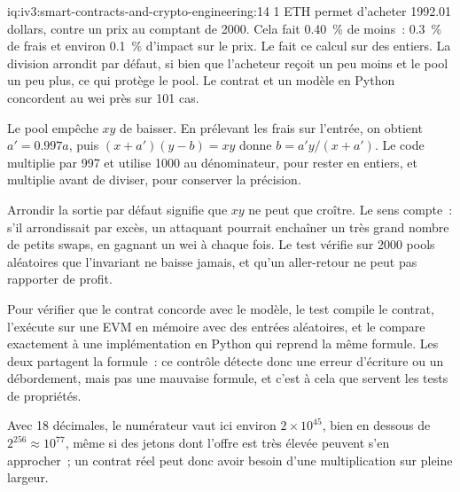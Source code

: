 \begin{solution}{iq:iv3:smart-contracts-and-crypto-engineering:14}
1 ETH permet d'acheter 1992.01 dollars, contre un prix au comptant de 2000. Cela fait 0.40~\% de moins~: 0.3~\% de frais et environ 0.1~\% d'impact sur le prix. Le  fait ce calcul sur des entiers. La division arrondit par défaut, si bien que l'acheteur reçoit un peu moins et le pool un peu plus, ce qui protège le pool. Le contrat et un modèle en Python concordent au wei près sur 101 cas.
\label{lst:iv3:cr:amm}

Le pool empêche $x y$ de baisser. En prélevant les frais sur l'entrée, on obtient $a' = 0.997 a$, puis $(x + a')(y - b) = xy$ donne $b = a' y / (x + a')$. Le code multiplie par 997 et utilise 1000 au dénominateur, pour rester en entiers, et multiplie avant de diviser, pour conserver la précision.

Arrondir la sortie par défaut signifie que $x y$ ne peut que croître. Le sens compte~: s'il arrondissait par excès, un attaquant pourrait enchaîner un très grand nombre de petits swaps, en gagnant un wei à chaque fois. Le test vérifie sur 2000 pools aléatoires que l'invariant ne baisse jamais, et qu'un aller-retour ne peut pas rapporter de profit.

Pour vérifier que le contrat concorde avec le modèle, le test compile le contrat, l'exécute sur une EVM en mémoire avec des entrées aléatoires, et le compare exactement à une implémentation en Python qui reprend la même formule. Les deux partagent la formule~: ce contrôle détecte donc une erreur d'écriture ou un débordement, mais pas une mauvaise formule, et c'est à cela que servent les tests de propriétés.

Avec 18 décimales, le numérateur vaut ici environ $2 \times 10^{45}$, bien en dessous de $2^{256} \approx 10^{77}$, même si des jetons dont l'offre est très élevée peuvent s'en approcher~; un contrat réel peut donc avoir besoin d'une multiplication sur pleine largeur.

\end{solution}


